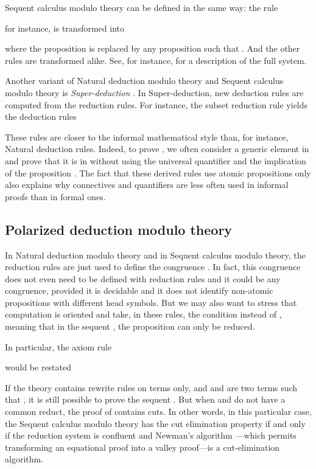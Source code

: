 \documentclass{llncs}
\begin{document}
Sequent calculus modulo theory can be defined in the same way:
the rule

for instance, is transformed into 

where the proposition  is replaced by any proposition  
such that . And the other rules are transformed
alike. See, for instance, \cite{DowekWerner} for a description of the full 
system.

Another variant of Natural deduction modulo theory and Sequent
calculus modulo theory is {\em Super-deduction}
\cite{Wack,KirchnerBraunerHoutmann}.  In Super-deduction, new
deduction rules are computed from the reduction rules.  For instance,
the subset reduction rule
yields the deduction rules 


These rules are closer to the informal mathematical style than, for 
instance, Natural deduction rules. Indeed, to prove , we often 
consider a generic element in  and prove that it is in  without 
using the universal quantifier and the implication of the proposition
. 
The fact that these derived rules use atomic propositions only also 
explains why connectives and quantifiers are less often 
used in informal proofs than in formal ones.

\subsection{Polarized deduction modulo theory}

In Natural deduction modulo theory and in Sequent calculus modulo
theory, the reduction rules are just used to define the congruence
. In fact, this congruence does not even need to be defined
with reduction rules and it could be any congruence, provided it is
decidable and it does not identify non-atomic propositions with
different head symbols.  But we may also want to stress that
computation is oriented and take, in these rules, the condition  instead of ,
meaning that in the sequent , the proposition 
can only be reduced.

In particular, the axiom rule 

would be restated

If the theory contains rewrite rules on terms only, and 
 and  are two terms such that , it is still possible 
to prove the sequent . But when  and  do not 
have a common reduct, the proof of  contains cuts.
In other words, in this particular case, the Sequent calculus modulo theory 
has the cut elimination property if and only if the reduction system is
confluent \cite{confluence} and Newman's algorithm \cite{Newman}---which 
permits transforming
an equational proof into a valley proof---is a cut-elimination 
algorithm.
\end{document}
